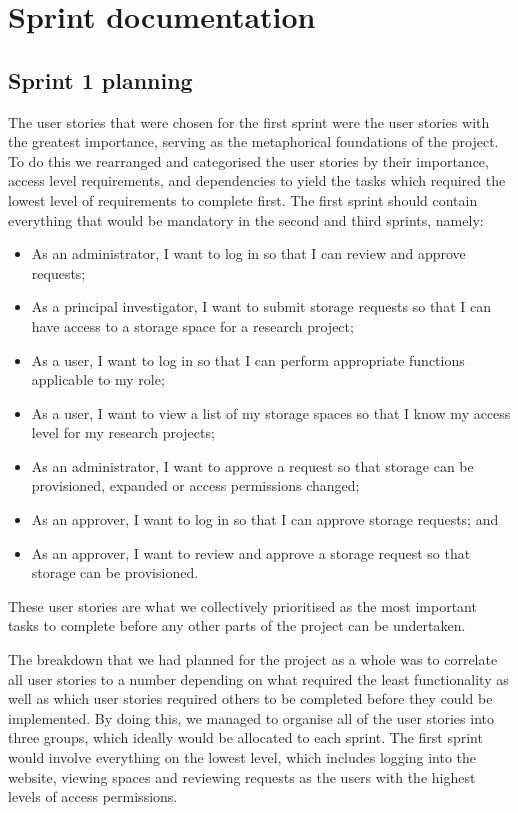 \documentclass[a4paper,titlepage,12pt]{article}
\let\stdsection\section
\renewcommand\section{\newpage\stdsection}
\begin{document}
\section{Sprint documentation}

\subsection{Sprint 1 planning}

The user stories that were chosen for the first sprint were the user stories
with the greatest importance, serving as the metaphorical foundations of the
project. To do this we rearranged and categorised the user stories by their
importance, access level requirements, and dependencies to yield the tasks
which required the lowest level of requirements to complete first. The first
sprint should contain everything that would be mandatory in the second and
third sprints, namely:

\begin{itemize}
	\item As an administrator, I want to log in so that I can review and
	      approve requests;
	\item As a principal investigator, I want to submit storage requests so
	      that I can have access to a storage space for a research project;
	\item As a user, I want to log in so that I can perform appropriate
	      functions applicable to my role;
	\item As a user, I want to view a list of my storage spaces so that I
	      know my access level for my research projects;
	\item As an administrator, I want to approve a request so that storage
	      can be provisioned, expanded or access permissions changed;
	\item As an approver, I want to log in so that I can approve storage
	      requests; and
	\item As an approver, I want to review and approve a storage request so
	      that storage can be provisioned.
\end{itemize}

These user stories are what we collectively prioritised as the most important
tasks to complete before any other parts of the project can be undertaken.

The breakdown that we had planned for the project as a whole was to correlate
all user stories to a number depending on what required the least functionality
as well as which user stories required others to be completed before they could
be implemented. By doing this, we managed to organise all of the user stories
into three groups, which ideally would be allocated to each sprint. The first
sprint would involve everything on the lowest level, which includes logging
into the website, viewing spaces and reviewing requests as the users with the
highest levels of access permissions.
\end{document}
